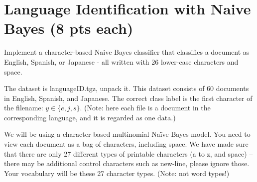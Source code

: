 \documentclass[a4paper]{article}
\theoremstyle{definition}
\begin{document}
\section{Language Identification with Naive Bayes (8 pts each)}
Implement a character-based Naive Bayes classifier that classifies a document as English, Spanish, or Japanese - all written with 26 lower-case characters and space.

The dataset is languageID.tgz, unpack it. This dataset consists of 60 documents in English, Spanish, and Japanese. The correct class label is the first character of the filename: $y \in \{e, j, s\}$. (Note: here each file is a document in the corresponding language, and it is regarded as one data.)

We will be using a character-based multinomial Naïve Bayes model. You need to view each document as a bag of characters, including space. We have made sure that there are only 27 different types of printable characters (a to z, and space) -- there may be additional control characters such as new-line, please ignore those. Your vocabulary will be these 27 character types. (Note: not word types!)
\end{document}
